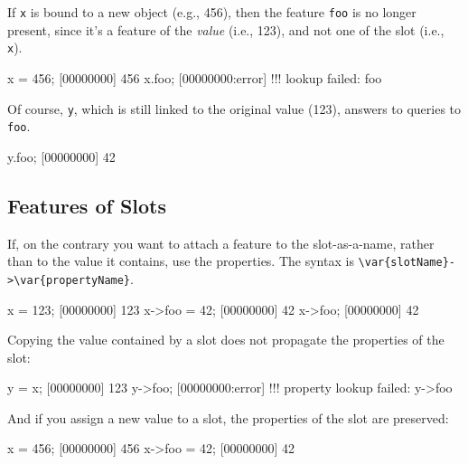 If \lstinline|x| is bound to a new object (e.g., 456), then the feature
\lstinline|foo| is no longer present, since it's a feature of the
\emph{value} (i.e., 123), and not one of the slot (i.e., \lstinline|x|).

\begin{urbiscript}
x = 456;
[00000000] 456
x.foo;
[00000000:error] !!! lookup failed: foo
\end{urbiscript}

Of course, \lstinline|y|, which is still linked to the original value (123),
answers to queries to \lstinline|foo|.

\begin{urbiscript}
y.foo;
[00000000] 42
\end{urbiscript}

\subsection{Features of Slots}

If, on the contrary you want to attach a feature to the slot-as-a-name,
rather than to the value it contains, use the properties.  The syntax is
\lstinline|\var{slotName}->\var{propertyName}|.

\begin{urbiscript}
x = 123;
[00000000] 123
x->foo = 42;
[00000000] 42
x->foo;
[00000000] 42
\end{urbiscript}

Copying the value contained by a slot does not propagate the properties of
the slot:

\begin{urbiscript}
y = x;
[00000000] 123
y->foo;
[00000000:error] !!! property lookup failed: y->foo
\end{urbiscript}

And if you assign a new value to a slot, the properties of the slot are
preserved:

\begin{urbiscript}
x = 456;
[00000000] 456
x->foo = 42;
[00000000] 42
\end{urbiscript}



